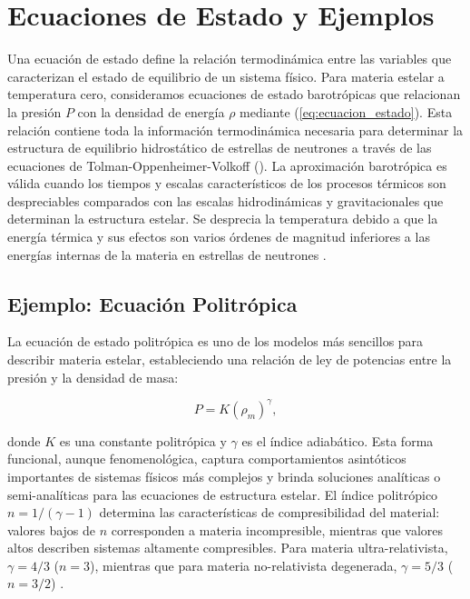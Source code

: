 \section{Ecuaciones de Estado y Ejemplos}

Una ecuación de estado define la relación termodinámica entre las variables que caracterizan el estado de equilibrio de un sistema físico. Para materia estelar a temperatura cero, consideramos ecuaciones de estado barotrópicas que relacionan la presión $P$ con la densidad de energía $\rho$ mediante (\ref{eq:ecuacion_estado}). Esta relación contiene toda la información termodinámica necesaria para determinar la estructura de equilibrio hidrostático de estrellas de neutrones a través de las ecuaciones de Tolman-Oppenheimer-Volkoff (\sistemaTOV). La aproximación barotrópica es válida cuando los tiempos y escalas característicos de los procesos térmicos son despreciables comparados con las escalas hidrodinámicas y gravitacionales que determinan la estructura estelar. Se desprecia la temperatura debido a que la energía térmica y sus efectos son varios órdenes de magnitud inferiores a las energías internas de la materia en estrellas de neutrones \cite{shapiroBlackHolesWhite2008}.

\subsection{Ejemplo: Ecuación Politrópica}

La ecuación de estado politrópica es uno de los modelos más sencillos para describir materia estelar, estableciendo una relación de ley de potencias entre la presión y la densidad de masa:

\begin{equation}
	P = K (\rho_m)^{\gamma},
	\label{eq:eos_politropica}
\end{equation}

donde $K$ es una constante politrópica y $\gamma$ es el índice adiabático. Esta forma funcional, aunque fenomenológica, captura comportamientos asintóticos importantes de sistemas físicos más complejos y brinda soluciones analíticas o semi-analíticas para las ecuaciones de estructura estelar. El índice politrópico $n = 1/(\gamma - 1)$ determina las características de compresibilidad del material: valores bajos de $n$ corresponden a materia incompresible, mientras que valores altos describen sistemas altamente compresibles. Para materia ultra-relativista, $\gamma = 4/3$ ($n = 3$), mientras que para materia no-relativista degenerada, $\gamma = 5/3$ ($n = 3/2$) \cite{chandrasekharIntroductionStudyStellar1970}.

